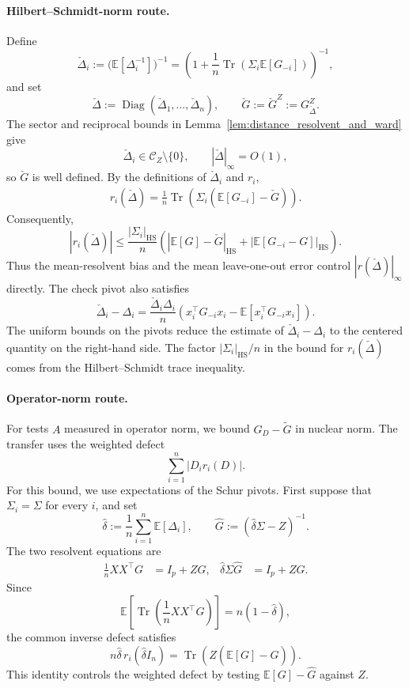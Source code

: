 \documentclass[EJP, preprint, NODS, nobera, nofontexpansion]{ejpecp}
\DeclareMathOperator{\tr}{Tr}
\DeclareMathOperator{\diag}{Diag}
\DeclareMathOperator{\hs}{HS}
\begin{document}
\paragraph{Hilbert--Schmidt-norm route.}
Define
\[
    \check\Delta_i
    :=
    \bigl(\mathbb E[\Delta_i^{-1}]\bigr)^{-1}
    =
    \left(
        1+\frac1n
        \tr(\Sigma_i\mathbb E[G_{-i}])
    \right)^{-1},
\]
and set
\[
    \check\Delta
    :=
    \diag(\check\Delta_1,\ldots,\check\Delta_n),
    \qquad
    \check G:=\check G^Z:=G_{\check\Delta}^Z.
\]
The sector and reciprocal bounds in
Lemma~\ref{lem:distance_resolvent_and_ward} give
\[
    \check\Delta_i\in\mathcal C_Z\setminus\{0\},
    \qquad
    |\check\Delta|_\infty=O(1),
\]
so \(\check G\) is well defined.  By the definitions of \(\check\Delta_i\) and \(r_i\),
\begin{align}
\label{eq:check_pivot_exact_defect}
    r_i(\check\Delta)
    =
    \frac1n
    \tr\!\left(
        \Sigma_i(
            \mathbb E[G_{-i}]-\check G
        )
    \right).
\end{align}
Consequently,
\[
    |r_i(\check\Delta)|
    \leq
    \frac{|\Sigma_i|_{\hs}}n
    \left(
        |\mathbb E[G]-\check G|_{\hs}
        +
        |\mathbb E[G_{-i}-G]|_{\hs}
    \right).
\]
Thus the mean-resolvent bias and the mean leave-one-out error control
\(|r(\check\Delta)|_\infty\) directly. The check pivot also satisfies
\[
 \check\Delta_i-\Delta_i
 =\frac{\check\Delta_i\Delta_i}{n}
 \left(x_i^\top G_{-i}x_i
       -\mathbb E[x_i^\top G_{-i}x_i]\right).
\]
The uniform bounds on the pivots reduce the estimate of
\(\check\Delta_i-\Delta_i\) to the centered quantity on the right-hand side. The factor \(|\Sigma_i|_{\hs}/n\) in the bound for
\(r_i(\check\Delta)\) comes from the Hilbert--Schmidt trace inequality.

\paragraph{Operator-norm route.}
For tests \(A\) measured in operator norm, we bound
\(G_D-\widetilde G\) in nuclear norm. The transfer uses the weighted defect
\[
    \sum_{i=1}^n|D_ir_i(D)|.
\]
For this bound, we use expectations of the Schur pivots.
First suppose that \(\Sigma_i=\Sigma\) for every \(i\), and set
\[
    \widehat\delta
    :=
    \frac1n\sum_{i=1}^n\mathbb E[\Delta_i],
    \qquad
    \widehat G
    :=
    (\widehat\delta\Sigma-Z)^{-1}.
\]
The two resolvent equations are
\begin{align}
    \frac1nXX^\top G
    &=
    I_p+ZG,
    &
    \widehat\delta\Sigma\widehat G
    &=
    I_p+Z\widehat G.
\end{align}
Since
\[
    \mathbb E\!\left[
        \tr\!\left(
            \frac1nXX^\top G
        \right)
    \right]
    =
    n(1-\widehat\delta),
\]
the common inverse defect satisfies
\[
    n\widehat\delta\,
    r_i(\widehat\delta I_n)
    =
    \tr\!\left(
        Z(\mathbb E[G]-\widehat G)
    \right).
\]
This identity controls the weighted defect by testing
\(\mathbb E[G]-\widehat G\) against \(Z\).
\end{document}
